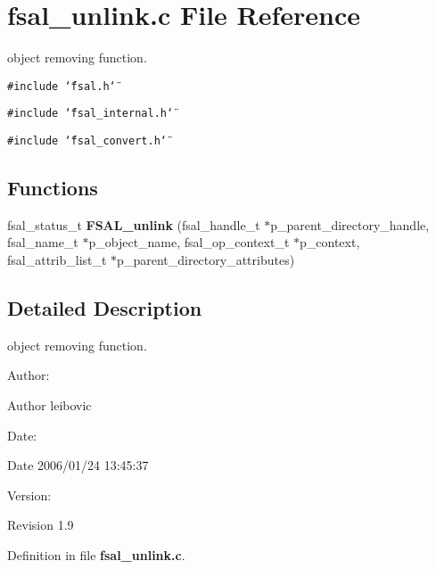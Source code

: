 \section{fsal\_\-unlink.c File Reference}
\label{fsal__unlink_8c}
object removing function.  


{\tt \#include \char`\"{}fsal.h\char`\"{}}\par
{\tt \#include \char`\"{}fsal\_\-internal.h\char`\"{}}\par
{\tt \#include \char`\"{}fsal\_\-convert.h\char`\"{}}\par
\subsection*{Functions}
\begin{CompactItemize}
\item 
fsal\_\-status\_\-t {\bf FSAL\_\-unlink} (fsal\_\-handle\_\-t $\ast$p\_\-parent\_\-directory\_\-handle, fsal\_\-name\_\-t $\ast$p\_\-object\_\-name, fsal\_\-op\_\-context\_\-t $\ast$p\_\-context, fsal\_\-attrib\_\-list\_\-t $\ast$p\_\-parent\_\-directory\_\-attributes)
\end{CompactItemize}


\subsection{Detailed Description}
object removing function. 

\begin{Desc}
\item[Author:]\end{Desc}
\begin{Desc}
\item[Author]leibovic \end{Desc}
\begin{Desc}
\item[Date:]\end{Desc}
\begin{Desc}
\item[Date]2006/01/24 13:45:37 \end{Desc}
\begin{Desc}
\item[Version:]\end{Desc}
\begin{Desc}
\item[Revision]1.9 \end{Desc}


Definition in file {\bf fsal\_\-unlink.c}.

